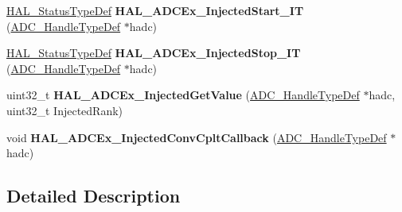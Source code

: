 \begin{DoxyCompactItemize}
\item 
\mbox{\label{group___a_d_c_ex___exported___functions___group1_gaf55cd28b1394a0564f99e1f5069c0ed1}} 
\hyperlink{stm32f1xx__hal__def_8h_a63c0679d1cb8b8c684fbb0632743478f}{H\+A\+L\+\_\+\+Status\+Type\+Def} {\bfseries H\+A\+L\+\_\+\+A\+D\+C\+Ex\+\_\+\+Injected\+Start\+\_\+\+IT} (\hyperlink{struct_a_d_c___handle_type_def}{A\+D\+C\+\_\+\+Handle\+Type\+Def} $\ast$hadc)
\item 
\mbox{\label{group___a_d_c_ex___exported___functions___group1_gae032f41136f4dc4b3f3c2476b96a21f5}} 
\hyperlink{stm32f1xx__hal__def_8h_a63c0679d1cb8b8c684fbb0632743478f}{H\+A\+L\+\_\+\+Status\+Type\+Def} {\bfseries H\+A\+L\+\_\+\+A\+D\+C\+Ex\+\_\+\+Injected\+Stop\+\_\+\+IT} (\hyperlink{struct_a_d_c___handle_type_def}{A\+D\+C\+\_\+\+Handle\+Type\+Def} $\ast$hadc)
\item 
\mbox{\label{group___a_d_c_ex___exported___functions___group1_ga7996668b61263f91c76d5f55551f3a07}} 
uint32\+\_\+t {\bfseries H\+A\+L\+\_\+\+A\+D\+C\+Ex\+\_\+\+Injected\+Get\+Value} (\hyperlink{struct_a_d_c___handle_type_def}{A\+D\+C\+\_\+\+Handle\+Type\+Def} $\ast$hadc, uint32\+\_\+t Injected\+Rank)
\item 
\mbox{\label{group___a_d_c_ex___exported___functions___group1_gaed7815e8b636ff1c1f456ecbaffe1942}} 
void {\bfseries H\+A\+L\+\_\+\+A\+D\+C\+Ex\+\_\+\+Injected\+Conv\+Cplt\+Callback} (\hyperlink{struct_a_d_c___handle_type_def}{A\+D\+C\+\_\+\+Handle\+Type\+Def} $\ast$hadc)
\end{DoxyCompactItemize}


\subsection{Detailed Description}
